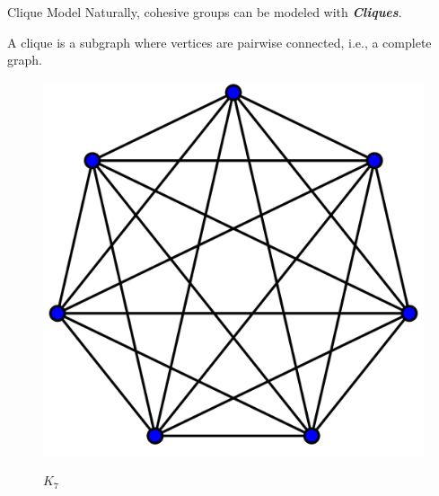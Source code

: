 \documentclass[9pt,notheorems]{beamer} %
\begin{document}
\begin{frame}{Clique Model}
    Naturally, cohesive groups can be modeled with \textbf{\emph{Cliques}}.
    
    A clique is a subgraph where vertices are pairwise connected, i.e., a complete graph.
    
    \centering
    \begin{minipage}[c]{0.4\linewidth}
        \begin{figure}[h]
            \centering
            \includegraphics[height=.3\textheight]{pic/k7.png}\\
            \caption{$K_7$}
        \end{figure}
    \end{minipage}\hspace{1cm}
    \begin{minipage}{0.4\linewidth}
        \medskip
        \begin{figure}[h]
            \centering

\end{figure}
\end{minipage}
\end{frame}
\end{document}
